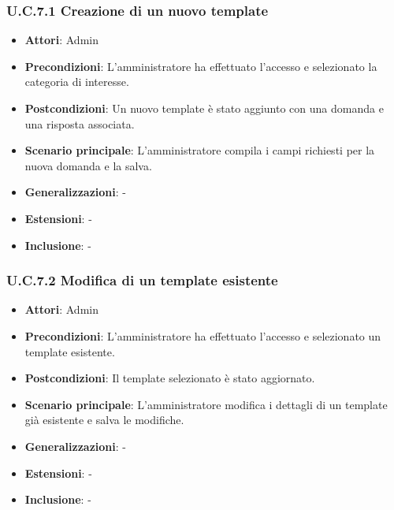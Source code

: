 \subsubsection{U.C.7.1 Creazione di un nuovo template}
\begin{itemize}
    \item \textbf{Attori}: Admin
    \item \textbf{Precondizioni}: L’amministratore ha effettuato l’accesso e selezionato la categoria di interesse.
    \item \textbf{Postcondizioni}: Un nuovo template è stato aggiunto con una domanda e una risposta associata.
    \item \textbf{Scenario principale}: L’amministratore compila i campi richiesti per la nuova domanda e la salva.
    \item \textbf{Generalizzazioni}: -
    \item \textbf{Estensioni}: -
    \item \textbf{Inclusione}: -
\end{itemize}
\subsubsection{U.C.7.2 Modifica di un template esistente}
\begin{itemize}
    \item \textbf{Attori}: Admin
    \item \textbf{Precondizioni}: L’amministratore ha effettuato l’accesso e selezionato un template esistente.
    \item \textbf{Postcondizioni}: Il template selezionato è stato aggiornato.
    \item \textbf{Scenario principale}: L’amministratore modifica i dettagli di un template già esistente e salva le modifiche.
    \item \textbf{Generalizzazioni}: -
    \item \textbf{Estensioni}: -
    \item \textbf{Inclusione}: -
\end{itemize}
